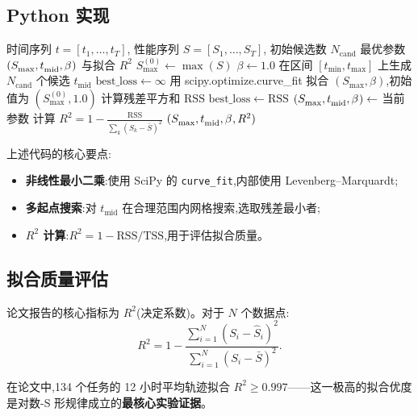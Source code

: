 \documentclass[a4paper,11pt]{article}
\begin{document}
\subsection{Python 实现}
\begin{algorithm}[H]
\caption{对数-S 形曲线拟合}
\label{alg:log-sigmoid-fit}
\begin{algorithmic}[1]
\REQUIRE 时间序列 $t = [t_{1}, \ldots, t_{T}]$, 性能序列 $S = [S_{1}, \ldots, S_{T}]$, 初始候选数 $N_{\mathrm{cand}}$
\ENSURE 最优参数 $(S_{\max}^{\*}, t_{\mathrm{mid}}^{\*}, \beta^{\*})$ 与拟合 $R^{2}$
\STATE $S_{\max}^{(0)} \gets \max(S)$
\STATE $\beta \gets 1.0$
\STATE 在区间 $[t_{\min}, t_{\max}]$ 上生成 $N_{\mathrm{cand}}$ 个候选 $t_{\mathrm{mid}}$
\STATE $\mathrm{best\_loss} \gets \infty$
    \STATE 用 scipy.optimize.curve\_fit 拟合 $(S_{\max}, \beta)$,初始值为 $(S_{\max}^{(0)}, 1.0)$
    \STATE 计算残差平方和 $\mathrm{RSS}$
        \STATE $\mathrm{best\_loss} \gets \mathrm{RSS}$
        \STATE $(S_{\max}^{\*}, t_{\mathrm{mid}}^{\*}, \beta^{\*}) \gets$ 当前参数
    \ENDIF
\ENDFOR
\STATE 计算 $R^{2} = 1 - \frac{\mathrm{RSS}}{\sum_{k}(S_{k} - \bar{S})^{2}}$
\RETURN $(S_{\max}^{\*}, t_{\mathrm{mid}}^{\*}, \beta^{\*}, R^{2})$
\end{algorithmic}
\end{algorithm}



上述代码的核心要点:
\begin{itemize}
    \item \textbf{非线性最小二乘}:使用 SciPy 的 \texttt{curve\_fit},内部使用 Levenberg--Marquardt;
    \item \textbf{多起点搜索}:对 $t_{\mathrm{mid}}$ 在合理范围内网格搜索,选取残差最小者;
    \item \textbf{$R^{2}$ 计算}:$R^{2} = 1 - \mathrm{RSS} / \mathrm{TSS}$,用于评估拟合质量。
\end{itemize}

\subsection{拟合质量评估}
论文报告的核心指标为 $R^{2}$(决定系数)。对于 $N$ 个数据点:
\[
    R^{2} = 1 - \frac{\sum_{i=1}^{N} (S_{i} - \hat{S}_{i})^{2}}{\sum_{i=1}^{N} (S_{i} - \bar{S})^{2}}.
\]

在论文中,134 个任务的 12 小时平均轨迹拟合 $R^{2} \geq 0.997$——这一极高的拟合优度是对数-S 形规律成立的\textbf{最核心实验证据}。
\end{document}
